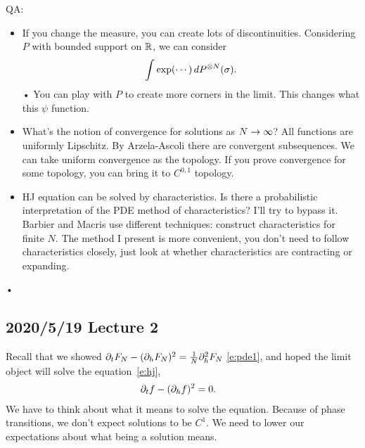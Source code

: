 QA:
\begin{itemize}
\item
If you change the measure, you can create lots of discontinuities.
Considering $P$ with bounded support on $\mathbb{R}$, we can consider
\begin{align*}
\int \exp(\cdots) \,dP^{\otimes N}(\sigma). 
\end{align*}•
You can play with $P$ to create more corners in the limit.
This changes what this $\psi$ function.
\item 
What's the notion of convergence for solutions as $N\to \infty$? All functions are uniformly Lipschitz. By Arzela-Ascoli there are convergent subsequences. We can take uniform convergence as the topology. If you prove convergence for some topology, you can bring it to $C^{0,1}$ topology.
\item 
HJ equation can be solved by characteristics. Is there a probabilistic interpretation of the PDE method of characteristics?
I'll try to bypass it. 
Barbier and Macris \cite{barbier2019adaptive} 
use different techniques: construct characteristics for finite $N$.
The method I present is more convenient, you don't need to follow characteristics closely, just look at whether characteristics are contracting or expanding. %
\end{itemize}•

\subsection*{2020/5/19 Lecture 2}

Recall that we showed $\partial_t F_N - (\partial_h F_N)^2 = \frac{1}{N} \partial_h^2 F_N$ \eqref{e:pde1}, and hoped the limit object will solve the equation~\eqref{e:hj},
\begin{align*}
\partial_t f- (\partial_h f)^2 &=0.
\end{align*}
We have to think about what it means to solve the equation. Because of phase transitions, we don't expect solutions to be $C^1$.
We need to lower our expectations about what being a solution means.

